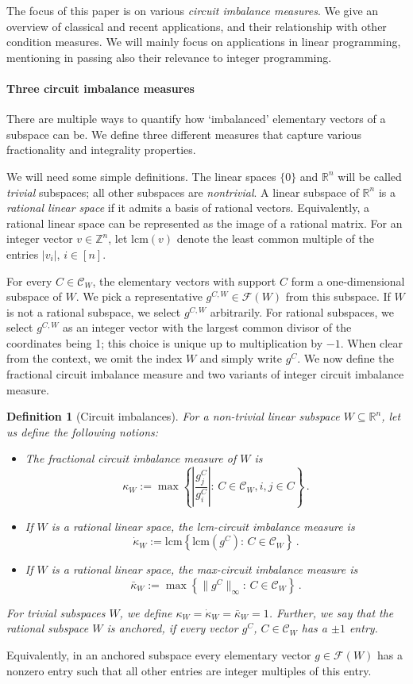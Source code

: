 \documentclass[11pt, a4paper]{article}
\newcommand{\Le}{\kappa}
\newcommand{\circuits}{\mathcal{C}}
\newcommand{\1}{\mathbbm{1}}
\newcommand{\kd}{{\dot{\kappa}}}
\newcommand{\EE}{\mathcal F}
\newcommand{\lcm}{\mathrm{lcm}}
\newtheorem{Def}[theorem]{Definition}
\theoremstyle{case}
\newcommand{\R}{\mathbb{R}}
\newcommand{\Z}{\mathbb{Z}}
\begin{document}
The focus of this paper is on various  \emph{circuit imbalance measures}. We give an overview of classical and recent applications, and their relationship with other condition measures. We will mainly focus on applications in linear programming, mentioning in passing also their relevance to integer programming. 

\paragraph{Three circuit imbalance measures}
There are multiple ways to quantify  how `imbalanced' elementary vectors of a subspace can be. We define three different measures that capture various fractionality and integrality properties.

We will need some simple definitions.
The linear spaces $\{0\}$ and  $\R^n$ will be called \emph{trivial} subspaces; all other subspaces are \emph{nontrivial}. A linear subspace of $\R^n$ is a \emph{rational linear space} if it admits a basis of rational vectors. Equivalently, a rational linear space can be represented as the image of a rational matrix.
For an integer vector $v\in\Z^n$, let $\lcm(v)$ denote the least common multiple of the entries $|v_i|$, $i\in [n]$.

For every $C\in \circuits_W$, the elementary vectors with support $C$ form a one-dimensional subspace of $W$. We pick a representative $g^{C,W}\in \EE(W)$ from this subspace.
If $W$ is not a rational subspace, we select $g^{C,W}$ arbitrarily. For rational subspaces, we select $g^{C,W}$ as an integer vector with the largest common divisor of the coordinates being 1;
this choice is unique up to multiplication by $-1$.  When clear from the context, we omit the index $W$ and simply write $g^C$.
We now define the fractional circuit imbalance measure and two variants of integer circuit imbalance measure. 

\begin{Def}[Circuit imbalances]\label{def:kappa} For a non-trivial linear subspace $W\subseteq \R^n$, let us define the following notions:
\begin{itemize}
    \item
The \emph{fractional circuit imbalance measure} of $W$ is
\[
\kappa_W:=\max\left\{\left|\frac{g^C_j}{g^C_i}\right|:\,C\in\circuits_W, i,j\in C\right\}\, .
\]
\item If $W$ is a rational linear space,  the \emph{lcm-circuit imbalance measure}  is
\[
\kd_W:=\lcm\left\{\lcm(g^C):\,C\in\circuits_W\right\}\, .
\]
\item If $W$ is a rational linear space, the 
 \emph{max-circuit imbalance measure}  is
\[
\bar\kappa_W:=\max\left\{\|g^C\|_\infty:\,C\in\circuits_W\right\}\, .
\]
\end{itemize}
For trivial subspaces $W$, we define $\Le_W=\kd_W=\bar\kappa_W=1$.
Further, we say that the rational subspace $W$ is \emph{anchored}, if every vector $g^C$, $C\in\circuits_W$ has a $\pm 1$ entry.
\end{Def} 
Equivalently, in an anchored subspace every elementary vector $g\in\EE(W)$ has a nonzero entry such that all other entries are integer multiples of this entry.
\end{document}
